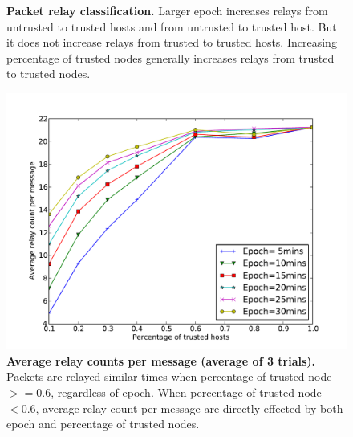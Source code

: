 \documentclass[11pt]{article}
\begin{document}
\begin{figure}[h!]
\center
{}
\hfill
{}
\caption{{\bf Packet relay classification.}
Larger epoch increases relays from untrusted to trusted hosts and from untrusted to trusted host.  But it does not increase relays from trusted to trusted hosts.
Increasing percentage of trusted nodes generally increases relays from trusted to trusted nodes.
}
\label{fig:relay_classification}
\end{figure}






\begin{figure}[h!]
\center
\includegraphics[width=0.6\columnwidth]{figures/average_relay_count.pdf}
\caption{{\bf Average relay counts per message (average of 3 trials).}
Packets are relayed similar times when percentage of trusted node $>= 0.6$, regardless of epoch.  
When percentage of trusted node $<0.6$, average relay count per message are directly effected by both epoch and percentage of trusted nodes. 
}
\label{fig:relay_count}
\end{figure}
\end{document}
